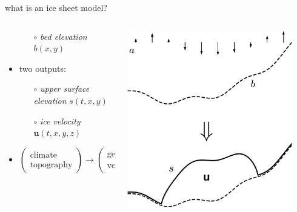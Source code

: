 \documentclass[svgnames,
               hyperref={colorlinks,citecolor=DeepPink4,linkcolor=FireBrick,urlcolor=Maroon},
               usepdftitle=false]  %
               {beamer}
\newcommand{\bu}{\mathbf{u}}
\begin{document}
\begin{frame}{what is an ice sheet model?}
\begin{columns}
\begin{column}{0.6\textwidth}
\begin{itemize}
\begin{itemize}
    \item[$\circ$] \emph{bed elevation} $b(x,y)$
    \end{itemize}
\item two outputs:
    \begin{itemize}
    \item[$\circ$] \emph{upper surface elevation} $s(t,x,y)$
    \item[$\circ$] \emph{ice velocity} $\bu(t,x,y,z)$
    \end{itemize}
\item {\small $\begin{pmatrix} \text{climate} \\ \text{topography} \end{pmatrix} \to \begin{pmatrix} \text{geometry} \\ \text{velocity} \end{pmatrix}$}
\end{itemize}
\end{column}
\begin{column}{0.42\textwidth}
\hfill \includegraphics[width=0.9\textwidth]{images/map-velocity.png}

\vspace{2mm}
\end{column}
\end{columns}
\end{frame}
\end{document}
